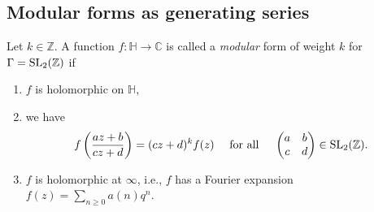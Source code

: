 \documentclass[reqno]{amsart} 
\numberwithin{theorem}{section}
\numberwithin{equation}{section}
\begin{document}
\subsection{Modular forms as generating series}

\begin{definition}
  Let $k \in \mathbb{Z}$.  A function $f : \mathbb{H} \rightarrow \mathbb{C}$ is called a \emph{modular} form of weight $k$ for $\Gamma = \operatorname{SL}_2(\mathbb{Z})$ if
  \begin{enumerate}
  \item $f$ is holomorphic on $\mathbb{H}$,
  \item we have
    \begin{equation*}
      f \left( \frac{a z + b}{c z + d} \right) = (c z + d)^k f(z)
      \quad
      \text{ for all }
      \quad 
      \begin{pmatrix}
        a        & b \\
        c & d \\
      \end{pmatrix} \in \operatorname{SL}_2(\mathbb{Z}).
    \end{equation*}
  \item $f$ is holomorphic at $\infty$, i.e., $f$ has a Fourier expansion $f(z) = \sum_{n \geq 0} a(n) q^n$.
  \end{enumerate}  
\end{definition}
\end{document}
